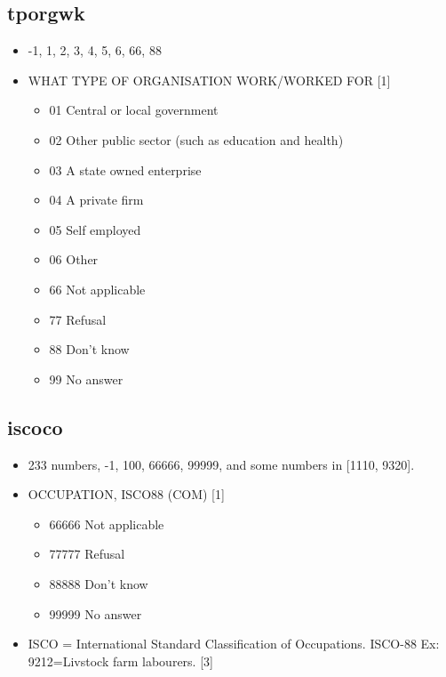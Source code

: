 \documentclass[12pt]{article}
\begin{document}
\subsection{tporgwk}
\begin{itemize}
\item -1, 1, 2, 3, 4, 5, 6, 66, 88
\item WHAT TYPE OF ORGANISATION WORK/WORKED FOR [1]
\begin{itemize}
\item 01 Central or local government 
\item 02 Other public sector (such as education and health) 
\item 03 A state owned enterprise 
\item 04 A private firm 
\item 05 Self employed 
\item 06 Other                                                  
\item 66 Not applicable 
\item 77 Refusal                                            
\item 88 Don’t know 
\item 99 No answer
\end{itemize}
\end{itemize}

\subsection{iscoco}
\begin{itemize}
\item 233 numbers, -1, 100, 66666, 99999, and some numbers in [1110, 9320].
\item OCCUPATION, ISCO88 (COM) [1]
\begin{itemize}
\item 66666 Not applicable 
\item 77777 Refusal
\item 88888 Don’t know 
\item 99999 No answer 
\end{itemize}
\item
ISCO = International Standard Classification of Occupations. ISCO-88
Ex: 9212=Livstock farm labourers. [3]
\end{itemize}
\end{document}
